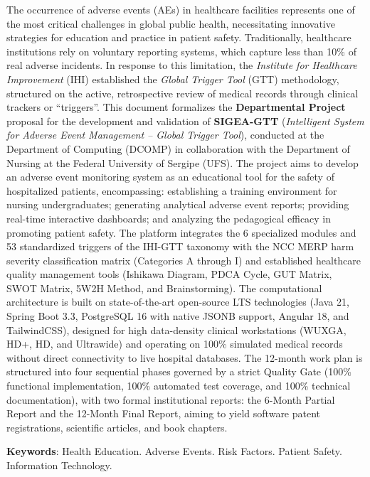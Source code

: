 \begin{resumo}[Abstract]
The occurrence of adverse events (AEs) in healthcare facilities represents one of the most critical challenges in global public health, necessitating innovative strategies for education and practice in patient safety. Traditionally, healthcare institutions rely on voluntary reporting systems, which capture less than 10\% of real adverse incidents. In response to this limitation, the \textit{Institute for Healthcare Improvement} (IHI) established the \textit{Global Trigger Tool} (GTT) methodology, structured on the active, retrospective review of medical records through clinical trackers or ``triggers''. This document formalizes the \textbf{Departmental Project} proposal for the development and validation of \textbf{SIGEA-GTT} (\textit{Intelligent System for Adverse Event Management – Global Trigger Tool}), conducted at the Department of Computing (DCOMP) in collaboration with the Department of Nursing at the Federal University of Sergipe (UFS). The project aims to develop an adverse event monitoring system as an educational tool for the safety of hospitalized patients, encompassing: establishing a training environment for nursing undergraduates; generating analytical adverse event reports; providing real-time interactive dashboards; and analyzing the pedagogical efficacy in promoting patient safety. The platform integrates the 6 specialized modules and 53 standardized triggers of the IHI-GTT taxonomy with the NCC MERP harm severity classification matrix (Categories A through I) and established healthcare quality management tools (Ishikawa Diagram, PDCA Cycle, GUT Matrix, SWOT Matrix, 5W2H Method, and Brainstorming). The computational architecture is built on state-of-the-art open-source LTS technologies (Java 21, Spring Boot 3.3, PostgreSQL 16 with native JSONB support, Angular 18, and TailwindCSS), designed for high data-density clinical workstations (WUXGA, HD+, HD, and Ultrawide) and operating on 100\% simulated medical records without direct connectivity to live hospital databases. The 12-month work plan is structured into four sequential phases governed by a strict Quality Gate (100\% functional implementation, 100\% automated test coverage, and 100\% technical documentation), with two formal institutional reports: the 6-Month Partial Report and the 12-Month Final Report, aiming to yield software patent registrations, scientific articles, and book chapters.

\textbf{Keywords}: Health Education. Adverse Events. Risk Factors. Patient Safety. Information Technology.
\end{resumo}
